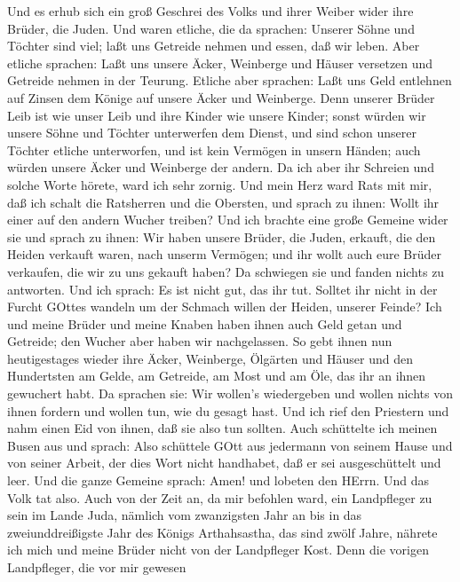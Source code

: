  Und es erhub sich ein groß Geschrei des Volks und ihrer
Weiber wider ihre Brüder, die Juden.  Und waren etliche, die
da sprachen: Unserer Söhne und Töchter sind viel; laßt uns Getreide
nehmen und essen, daß wir leben.  Aber etliche sprachen:
Laßt uns unsere Äcker, Weinberge und Häuser versetzen und Getreide
nehmen in der Teurung.  Etliche aber sprachen: Laßt uns Geld
entlehnen auf Zinsen dem Könige auf unsere Äcker und Weinberge.
 Denn unserer Brüder Leib ist wie unser Leib und ihre Kinder
wie unsere Kinder; sonst würden wir unsere Söhne und Töchter unterwerfen
dem Dienst, und sind schon unserer Töchter etliche unterworfen, und ist
kein Vermögen in unsern Händen; auch würden unsere Äcker und Weinberge
der andern.  Da ich aber ihr Schreien und solche Worte
hörete, ward ich sehr zornig.  Und mein Herz ward Rats mit
mir, daß ich schalt die Ratsherren und die Obersten, und sprach zu
ihnen: Wollt ihr einer auf den andern Wucher treiben? Und ich brachte
eine große Gemeine wider sie  und sprach zu ihnen: Wir haben
unsere Brüder, die Juden, erkauft, die den Heiden verkauft waren, nach
unserm Vermögen; und ihr wollt auch eure Brüder verkaufen, die wir zu
uns gekauft haben? Da schwiegen sie und fanden nichts zu antworten.
 Und ich sprach: Es ist nicht gut, das ihr tut. Solltet ihr
nicht in der Furcht GOttes wandeln um der Schmach willen der Heiden,
unserer Feinde?  Ich und meine Brüder und meine Knaben
haben ihnen auch Geld getan und Getreide; den Wucher aber haben wir
nachgelassen.  So gebt ihnen nun heutigestages wieder ihre
Äcker, Weinberge, Ölgärten und Häuser und den Hundertsten am Gelde, am
Getreide, am Most und am Öle, das ihr an ihnen gewuchert habt.
 Da sprachen sie: Wir wollen's wiedergeben und wollen
nichts von ihnen fordern und wollen tun, wie du gesagt hast. Und ich
rief den Priestern und nahm einen Eid von ihnen, daß sie also tun
sollten.  Auch schüttelte ich meinen Busen aus und sprach:
Also schüttele GOtt aus jedermann von seinem Hause und von seiner
Arbeit, der dies Wort nicht handhabet, daß er sei ausgeschüttelt und
leer. Und die ganze Gemeine sprach: Amen! und lobeten den HErrn. Und das
Volk tat also.  Auch von der Zeit an, da mir befohlen ward,
ein Landpfleger zu sein im Lande Juda, nämlich vom zwanzigsten Jahr an
bis in das zweiunddreißigste Jahr des Königs Arthahsastha, das sind
zwölf Jahre, nährete ich mich und meine Brüder nicht von der Landpfleger
Kost.  Denn die vorigen Landpfleger, die vor mir gewesen
